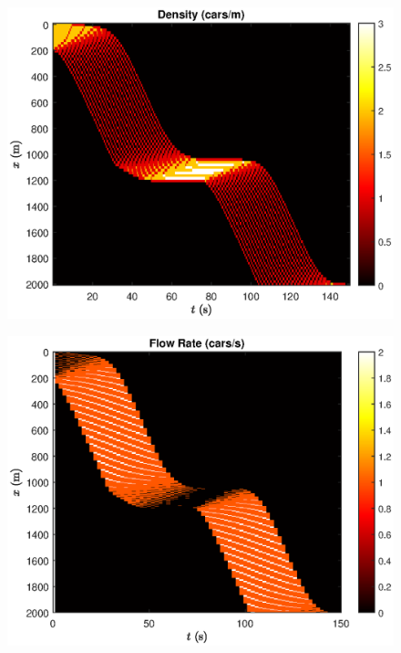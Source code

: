 \documentclass[12pt]{article}
\begin{document}
  \begin{figure}[H]
  \includegraphics[width=13cm]{BottleNeck5.eps}
  \centering
  \end{figure}

  \begin{figure}[H]
    \includegraphics[width=13cm]{BottleNeck6.eps}
    \centering
    \end{figure}
\end{document}
